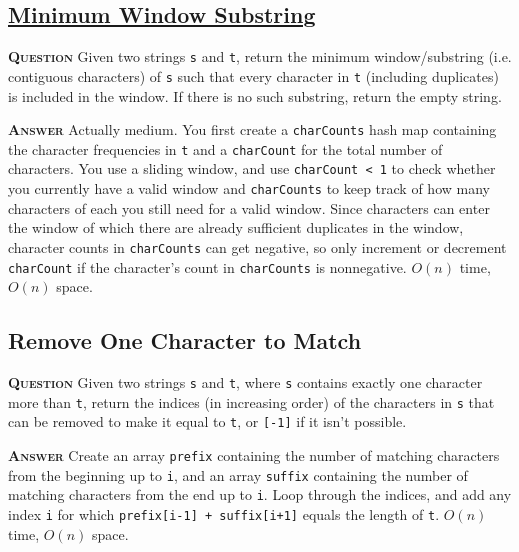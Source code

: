 \documentclass[table, xcdraw]{article}%
\begin{document}
\subsection{\href{https://leetcode.com/problems/minimum-window-substring}{Minimum Window Substring}}

\textsc{\textbf{Question}} Given two strings \texttt{s} and \texttt{t}, return the minimum window/substring (i.e. contiguous characters) of \texttt{s} such that every character in \texttt{t} (including duplicates) is included in the window. If there is no such substring, return the empty string.

\textsc{\textbf{Answer}} Actually medium. You first create a \texttt{charCounts} hash map containing the character frequencies in \texttt{t} and a \texttt{charCount} for the total number of characters. You use a sliding window, and use \texttt{charCount < 1} to check whether you currently have a valid window and \texttt{charCounts} to keep track of how many characters of each you still need for a valid window. Since characters can enter the window of which there are already sufficient duplicates in the window, character counts in \texttt{charCounts} can get negative, so only increment or decrement \texttt{charCount} if the character's count in \texttt{charCounts} is nonnegative. $O(n)$ time, $O(n)$ space.

\subsection{Remove One Character to Match}

\textsc{\textbf{Question}} Given two strings \texttt{s} and \texttt{t}, where \texttt{s} contains exactly one character more than \texttt{t}, return the indices (in increasing order) of the characters in \texttt{s} that can be removed to make it equal to \texttt{t}, or  \texttt{[-1]} if it isn't possible.

\textsc{\textbf{Answer}} Create an array \texttt{prefix} containing the number of matching characters from the beginning up to \texttt{i}, and an array \texttt{suffix} containing the number of matching characters from the end up to \texttt{i}. Loop through the indices, and add any index \texttt{i} for which \texttt{prefix[i-1] + suffix[i+1]} equals the length of \texttt{t}. $O(n)$ time, $O(n)$ space.
\end{document}
